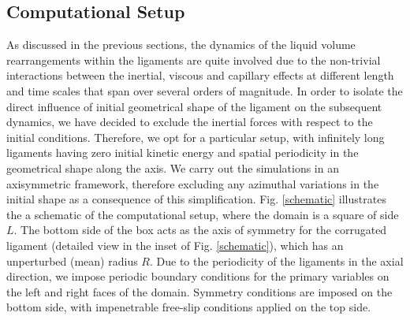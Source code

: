 \subsection*{Computational Setup}

As discussed in the previous sections, the 
dynamics of the liquid volume rearrangements 
within the ligaments are quite involved 
due to the non-trivial interactions between
the inertial, viscous and capillary effects 
at different length and time scales that span
over several orders of magnitude.
In order to isolate the direct influence of 
initial geometrical shape of the ligament on 
the subsequent dynamics, we have decided to 
exclude the inertial forces 
with respect to the initial conditions. 
Therefore, we opt for a particular setup,
with infinitely long ligaments having zero initial kinetic energy 
and spatial periodicity in the geometrical shape along the axis. 
We carry out the simulations in an axisymmetric framework, 
therefore excluding any azimuthal variations
in the initial shape as a consequence of this simplification. 
Fig. \ref{schematic} illustrates the a schematic of the
computational setup, where the domain is a square of side $L$. 
The bottom side of the box acts as the axis of symmetry for 
the corrugated ligament (detailed view in the inset of Fig. \ref{schematic}), 
which has an unperturbed (mean) radius $R$. 
Due to the periodicity of the ligaments in the axial direction, 
we impose periodic boundary conditions for the primary variables 
on the left and right faces of the domain.
Symmetry conditions are imposed on the bottom side, 
with impenetrable free-slip conditions applied on the top side. 


